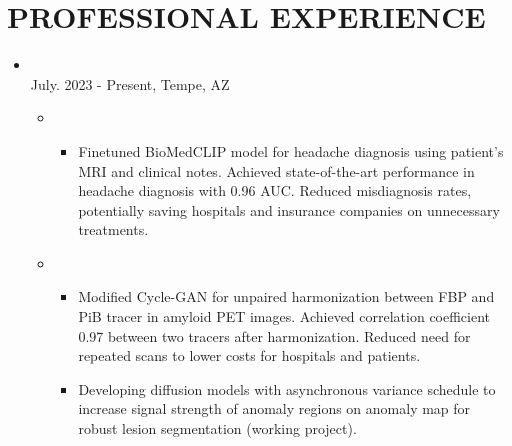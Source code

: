 \documentclass[10pt]{article}
\begin{document}
\vspace{-1.5em}
\section*{PROFESSIONAL EXPERIENCE}
\vspace{-0.5em}

\begin{itemize}
	\setlength\itemsep{0.5pt}

	\item {}\\
		\hfill{July. 2023 - Present, Tempe, AZ}
		\vspace{-0.5em}
		\begin{itemize}[label=$\bullet$]
			\item {}
            \vspace{-0.5em}
            \begin{itemize}[label=$-$]
				\setlength\itemsep{0.5pt}
				\item Finetuned BioMedCLIP model for headache diagnosis using patient's MRI and clinical notes. Achieved state-of-the-art performance in headache diagnosis with 0.96 AUC. Reduced misdiagnosis rates, potentially saving hospitals and insurance companies on unnecessary treatments.
			\end{itemize}

			\item {} 
            \vspace{-0.5em}
			\begin{itemize}[label=$-$]
				\setlength\itemsep{0.5pt}
				\item Modified Cycle-GAN for unpaired harmonization between FBP and PiB tracer in amyloid PET images. Achieved correlation coefficient 0.97 between two tracers after harmonization. Reduced need for repeated scans to lower costs for hospitals and patients.
				\item Developing diffusion models with asynchronous variance schedule to increase signal strength of anomaly regions on anomaly map for robust lesion segmentation (working project).
			\end{itemize}

		\end{itemize}
		


\end{itemize}
\end{document}
